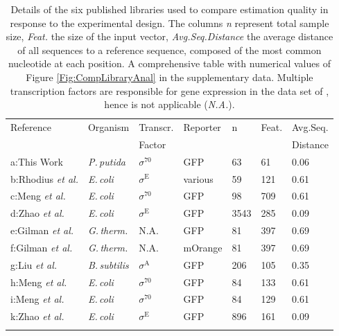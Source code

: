 \documentclass[utf8]{frontiersSCNS} %
\begin{document}
\newpage
\begin{table}[h!]
    \caption{Details of the six published libraries used to compare estimation quality in response to the experimental design. The columns \textit{n} represent total sample size, \textit{Feat.} the size of the input vector, \textit{Avg.Seq.Distance} the average distance of all sequences to a reference sequence, composed of the most common nucleotide at each position. A comprehensive table with numerical values of Figure \ref{Fig:CompLibraryAnal} in the supplementary data. Multiple transcription factors are responsible for gene expression in the data set of \cite{Gilman2019}, hence is not applicable (\textit{N.A.}).\label{Tab:LibrComp}}
    {
    \begin{tabular}{@{}l|l|l|l|l|l|l@{}}
        \toprule
        Reference   &Organism   & Transcr.  &Reporter   &n    &Feat. & Avg.Seq.\\
                    &           & Factor    &           &           &         & Distance\\\hline
        a:This Work & \textit{P.\,putida} & $\sigma^{70}$& GFP & 63 & 61 & 0.06\\\hline
        b:Rhodius \textit{et al.}&\textit{E.\,coli} & $\sigma^{\mathrm{E}}$ & various & 59 & 121 & 0.61\\\hline
        c:Meng \textit{et al.}&\textit{E.\,coli} & $\sigma^{70}$ & GFP & 98 & 709 & 0.61\\\hline
        d:Zhao \textit{et al.}&\textit{E.\,coli} & $\sigma^{\mathrm{E}}$ & GFP & 3543 & 285 & 0.09\\\hline
        e:Gilman \textit{et al.}&\textit{G.\,therm.} & N.A. & GFP & 81 & 397 & 0.69\\\hline
        f:Gilman \textit{et al.}&\textit{G.\,therm.} & N.A. & mOrange & 81 & 397 & 0.69\\\hline
        g:Liu \textit{et al.}&\textit{B.\,subtilis} & $\sigma^{\mathrm{A}}$ & GFP & 206 & 105 & 0.35\\\hline
        h:Meng \textit{et al.}&\textit{E.\,coli} & $\sigma^{70}$ & GFP & 84 & 133 & 0.61\\\hline
        i:Meng \textit{et al.}&\textit{E.\,coli} & $\sigma^{70}$ & GFP & 84 & 129 & 0.61\\\hline
        k:Zhao \textit{et al.}&\textit{E.\,coli} & $\sigma^{\mathrm{E}}$ & GFP & 896 & 161 & 0.09\\
        \botrule
    \end{tabular}
    }
    {} %
\end{table}
\end{document}
